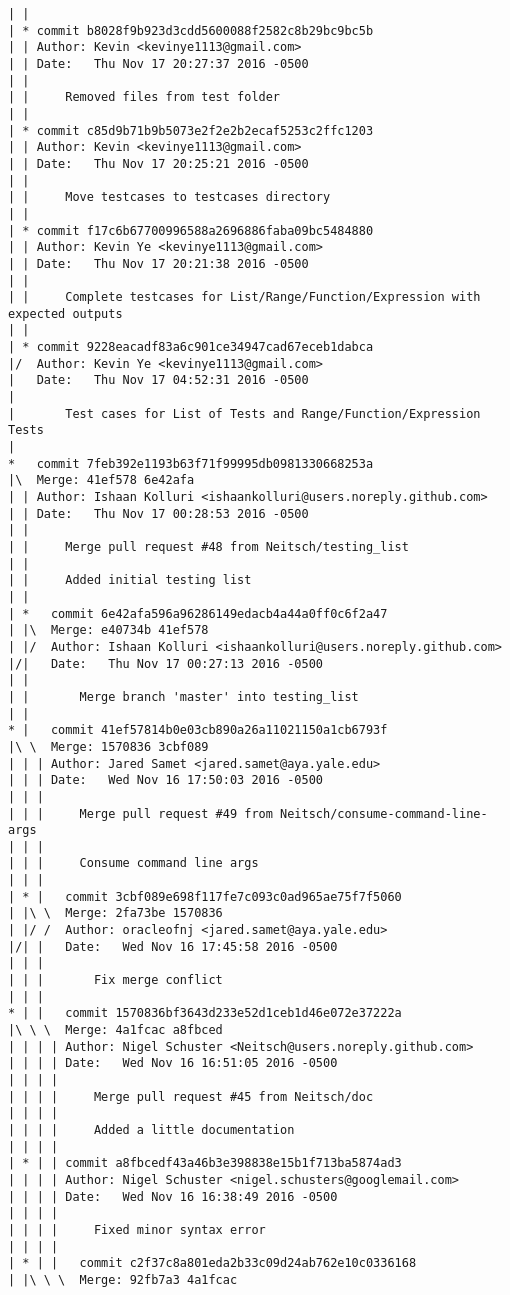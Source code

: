 \begin{lstlisting}
| |   
| * commit b8028f9b923d3cdd5600088f2582c8b29bc9bc5b
| | Author: Kevin <kevinye1113@gmail.com>
| | Date:   Thu Nov 17 20:27:37 2016 -0500
| | 
| |     Removed files from test folder
| |   
| * commit c85d9b71b9b5073e2f2e2b2ecaf5253c2ffc1203
| | Author: Kevin <kevinye1113@gmail.com>
| | Date:   Thu Nov 17 20:25:21 2016 -0500
| | 
| |     Move testcases to testcases directory
| |   
| * commit f17c6b67700996588a2696886faba09bc5484880
| | Author: Kevin Ye <kevinye1113@gmail.com>
| | Date:   Thu Nov 17 20:21:38 2016 -0500
| | 
| |     Complete testcases for List/Range/Function/Expression with expected outputs
| |   
| * commit 9228eacadf83a6c901ce34947cad67eceb1dabca
|/  Author: Kevin Ye <kevinye1113@gmail.com>
|   Date:   Thu Nov 17 04:52:31 2016 -0500
|   
|       Test cases for List of Tests and Range/Function/Expression Tests
|    
*   commit 7feb392e1193b63f71f99995db0981330668253a
|\  Merge: 41ef578 6e42afa
| | Author: Ishaan Kolluri <ishaankolluri@users.noreply.github.com>
| | Date:   Thu Nov 17 00:28:53 2016 -0500
| | 
| |     Merge pull request #48 from Neitsch/testing_list
| |     
| |     Added initial testing list
| |     
| *   commit 6e42afa596a96286149edacb4a44a0ff0c6f2a47
| |\  Merge: e40734b 41ef578
| |/  Author: Ishaan Kolluri <ishaankolluri@users.noreply.github.com>
|/|   Date:   Thu Nov 17 00:27:13 2016 -0500
| |   
| |       Merge branch 'master' into testing_list
| |     
* |   commit 41ef57814b0e03cb890a26a11021150a1cb6793f
|\ \  Merge: 1570836 3cbf089
| | | Author: Jared Samet <jared.samet@aya.yale.edu>
| | | Date:   Wed Nov 16 17:50:03 2016 -0500
| | | 
| | |     Merge pull request #49 from Neitsch/consume-command-line-args
| | |     
| | |     Consume command line args
| | |      
| * |   commit 3cbf089e698f117fe7c093c0ad965ae75f7f5060
| |\ \  Merge: 2fa73be 1570836
| |/ /  Author: oracleofnj <jared.samet@aya.yale.edu>
|/| |   Date:   Wed Nov 16 17:45:58 2016 -0500
| | |   
| | |       Fix merge conflict
| | |      
* | |   commit 1570836bf3643d233e52d1ceb1d46e072e37222a
|\ \ \  Merge: 4a1fcac a8fbced
| | | | Author: Nigel Schuster <Neitsch@users.noreply.github.com>
| | | | Date:   Wed Nov 16 16:51:05 2016 -0500
| | | | 
| | | |     Merge pull request #45 from Neitsch/doc
| | | |     
| | | |     Added a little documentation
| | | |     
| * | | commit a8fbcedf43a46b3e398838e15b1f713ba5874ad3
| | | | Author: Nigel Schuster <nigel.schusters@googlemail.com>
| | | | Date:   Wed Nov 16 16:38:49 2016 -0500
| | | | 
| | | |     Fixed minor syntax error
| | | |       
| * | |   commit c2f37c8a801eda2b33c09d24ab762e10c0336168
| |\ \ \  Merge: 92fb7a3 4a1fcac

\end{lstlisting}
